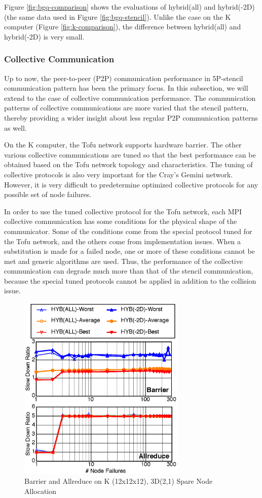 \documentclass[Afour,times,sageh]{sagej}
\begin{document}
Figure \ref{fig:bgq-comparison} shows the evaluations of hybrid(all)
and hybrid(-2D) (the same data used in Figure
\ref{fig:bgq-stencil}). Unlike the case on the K computer (Figure
\ref{fig:k-comparison}), the difference between hybrid(all) and
hybrid(-2D) is very small.

\subsubsection{Collective Communication}

Up to now, the peer-to-peer (P2P) communication performance in
5P-stencil communication pattern has been the primary focus. In this
subsection, we will extend to the case of collective communication
performance.
The communication patterns of collective communications are more
varied that the stencil pattern, thereby providing a wider insight
about less regular P2P communication patterns as well.

On the K computer, the Tofu network supports hardware barrier. The
other various collective communications are tuned so that the best
performance can be obtained based on the Tofu network topology and
characteristics. The tuning of collective protocols
is also very important for the Cray's Gemini
network\citep{Pena:2013:ATM:2488551.2488564}. However, it is very
difficult to predetermine optimized collective protocols for any
possible set of node failures.

In order to use the tuned collective protocol for the Tofu network,
each MPI collective communication has some conditions for the physical
shape of the communicator. Some of the conditions come from the
special protocol tuned for the Tofu network, and the others come from
implementation issues. When a substitution is made for a failed node,
one or more of these conditions cannot be met and generic algorithms
are used. Thus, the performance of the collective communication can
degrade much more than that of the stencil communication, because the
special tuned protocols cannot be applied in addition to the collision
issue.

\begin{figure}[ht]
\centering
\includegraphics[width=80mm]{Figs/K-Collective-CL.eps}
  \caption{Barrier and Allreduce on K (12x12x12), 3D(2,1) Spare Node
    Allocation}
  \label{fig:k-collective}
\end{figure}
\end{document}

